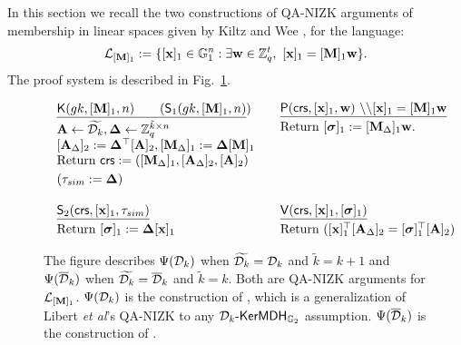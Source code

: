 In this section we recall the two constructions of QA-NIZK arguments of membership in linear spaces given by 
Kiltz and Wee \cite{EC:KilWee15}, for the language:
 $$\mathcal{L}_{[\mathbf{{M}}]_1}:=\{ [\mathbf{x}]_1 \in \mathbb{G}_1^{n}:  \exists \mathbf{w} \in \mathbb{Z}_q^{t}, \  [\mathbf{x}]_1=[\mathbf{{M}}]_1\mathbf{w} \}.$$ 
The proof system is described in Fig.~\ref{fig:QANIZKlinear}. 

\begin{figure} 
$$
\begin{array}{ll}
\begin{array}{l}
\underline{\algK(gk,[\matr{M}]_1,n) \qquad  (\mathsf{S}_1(gk,[\matr{M}]_1,n)})\\[.1cm]

\matr{A} \gets \widetilde{\dist_{k}}, \matr{\Delta} \gets \Z_q^{\tilde{k} \times n}\\
{[\matr{A}_{\Delta}]_2:= \matr{\Delta}^\top[\matr{A}]_2, [\matr{M}_{\Delta}]_1:=\matr{\Delta} [\matr{M}]_1} \\
\text{Return} \ \mathsf{crs}:=([\matr{M}_{\Delta}]_1, [\matr{A}_\Delta]_2, [\matr{A}]_2)\\ [.1cm]
(\tau_{sim}:=\matr{\Delta})
\end{array}
&
\begin{array}{l}
\underline{\algP(\mathsf{crs},[\vecb{x}]_1, \vecb{w}) \  \backslash \backslash [\vecb{x}]_1=[\matr{M}]_1 \vecb{w}} \\[.1cm]

 \text{Return } [\grkb{\sigma}]_1:=[\matr{M}_{\Delta}]_1 \vecb{w}.
\\
\\
\\
\vspace*{.2cm}
\end{array}
\\
\\
\begin{array}{l}
\underline{\mathsf{S}_2(\crs,[\vecb{x}]_1,\tau_{sim})}   \\ [.1cm]
  \text{Return} \ [\grkb{\sigma}]_1:= \matr{\Delta} [\vecb{x}]_1
\end{array}
&
\begin{array}{l}
\underline{\algV(\mathsf{crs},[\vecb{x}]_1,[\grkb{\sigma}]_1)}\\ [.1cm]
\text{Return} \ ([\vecb{x}]_1^\top [\matr{A}_\Delta]_2 = [\grkb{\sigma}]_1^\top[\matr{A}]_2)
\end{array}
\end{array}
$$
\caption{The figure describes $\ps$ when $\widetilde{\dist_{k}}=\dist_k$ and  $\tilde{k}=k+1$ and $\psws$ when $\widetilde{\dist_{k}}=\overline{\dist}_k$ and  $\tilde{k}=k$. Both are QA-NIZK arguments for $\mathcal{L}_{[\matr{M}]_1}$. 
$\ps$  is the construction of \cite[Section~3.1]{EC:KilWee15},
  which is a generalization 
of Libert \textit{et al}'s QA-NIZK \cite{EC:LPJY14} to any $\dist_k\mbox{-}\fmdh_{\Hr}$ assumption. $\psws$ is the construction of  \cite[Section~3.2.]{EC:KilWee15}%
  .}
\label{fig:QANIZKlinear}
\end{figure}

